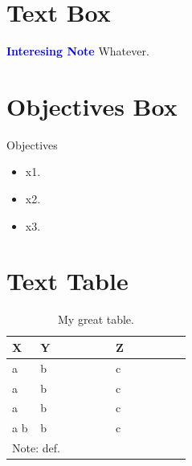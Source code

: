 \section{Text Box}
\begin{tcolorbox}[colback=blue!5!white,colframe=blue!75!black]
	\textcolor{blue}{\textbf{Interesing Note}}
	\tcblower
	Whatever.
\end{tcolorbox}

\section{Objectives Box}
\begin{center}
	\begin{objbox}{Objectives}
		\begin{itemize}
			\setlength{\itemsep}{0pt}
			\setlength{\parskip}{0pt}
			\setlength{\parsep}{0pt}
		
			\item x1.
			\item x2.
			\item x3.
		\end{itemize}
	\end{objbox}
\end{center}


\section{Text Table}
\begin{table}[H]
	\centering
	\begin{tabularx}{0.95\linewidth}{p{0.15\linewidth}p{0.40\linewidth}p{0.40\linewidth}}
		\toprule
		\textbf{X} & \textbf{Y} & \textbf{Z} \\
		\midrule
		a & b & c \\
		a & b & c \\
		a & b & c \\
		a \newline b & b & c \\ %
		\midrule
		\multicolumn{3}{p{0.95\linewidth}}{Note: def.} \\	
		\bottomrule
	\end{tabularx}
	\caption{My great table.}
	\label{03:tab01}
\end{table}

